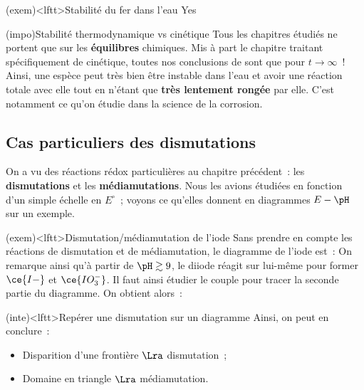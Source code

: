 \documentclass[../../main/main.tex]{subfiles}
\begin{document}
\begin{tcb*}(exem)<lftt>{Stabilité du fer dans l'eau}
	Yes
\end{tcb*}

\begin{tcb*}(impo){Stabilité thermodynamique vs cinétique}
	Tous les chapitres étudiés ne portent que sur les \textbf{équilibres}
	chimiques. Mis à part le chapitre traitant spécifiquement de cinétique, toutes
	nos conclusions de sont que pour $t \to \infty$~!
	\smallbreak
	Ainsi, une espèce peut très bien être instable dans l'eau et avoir une
	réaction totale avec elle tout en n'étant que \textbf{très lentement rongée}
	par elle. C'est notamment ce qu'on étudie dans la science de la corrosion.
\end{tcb*}

\subsection{Cas particuliers des dismutations}
On a vu des réactions rédox particulières au chapitre précédent~: les
\textbf{dismutations} et les \textbf{médiamutations}. Nous les avions étudiées
en fonction d'un simple échelle en $E^\circ$~; voyons ce qu'elles donnent en
diagrammes $E-\pH$ sur un exemple.

\begin{tcb*}(exem)<lftt>{Dismutation/médiamutation de l'iode}
	Sans prendre en compte les réactions de dismutation et de médiamutation, le
	diagramme de l'iode est~:
	On remarque ainsi qu'à partir de $\pH \gtrsim 9$, le diiode réagit sur
	lui-même pour former $\ce{I-}$ et $\ce{IO_3^-}$. Il faut ainsi étudier le
	couple  pour tracer la seconde partie du diagramme. On obtient
	alors~:
\end{tcb*}

\begin{tcb*}(inte)<lftt>{Repérer une dismutation sur un diagramme}
	Ainsi, on peut en conclure~:
	\begin{itemize}
		\item Disparition d'une frontière $\Lra$ dismutation~;
		\item Domaine en triangle $\Lra$ médiamutation.
	\end{itemize}
\end{tcb*}
\end{document}
